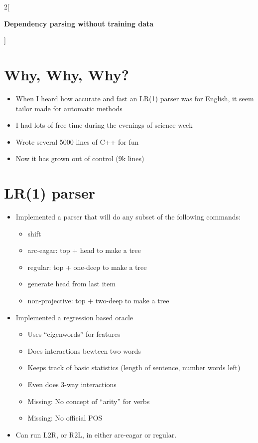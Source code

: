 \documentclass[12pt]{extarticle}
\date{\today}
\begin{document}
\sloppy
\begin{multicols*}{2}[
\centerline{\Huge\bf Dependency parsing without training data}
\vspace{2ex}
]

\section*{Why, Why, Why?}
\begin{itemize}
\item When I heard how accurate and fast an LR(1) parser was for English,
it seem tailor made for automatic methods
\item I had lots of free time during the evenings of science week
\item Wrote several 5000 lines of C++ for fun
\item Now it has grown out of control (9k lines)
\end{itemize}

\section*{LR(1) parser}
\begin{itemize}
\item Implemented a parser that will do any subset of the
following commands:
\begin{itemize}
\item shift
\item arc-eagar: top + head to make a tree
\item regular: top + one-deep to make a tree
\item generate head from last item
\item non-projective: top + two-deep to make a tree
\end{itemize}
\item Implemented a regression based oracle
\begin{itemize}
\item Uses ``eigenwords'' for features
\item Does interactions bewteen two words
\item Keeps track of basic statistics (length of sentence, number
words left)
\item Even does 3-way interactions
\item Missing: No concept of ``arity'' for verbs
\item Missing: No official POS
\end{itemize}
\item Can run L2R, or R2L, in either arc-eagar or regular.  
\end{itemize}


\end{multicols*}
\end{document}
